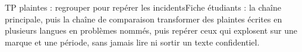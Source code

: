 \documentclass[11pt,a4paper]{article}
\begin{document}
  {TP plaintes : regrouper pour repérer les incidents}{Fiche étudiants : la chaîne principale, puis la chaîne de comparaison}
  {transformer des plaintes écrites en plusieurs langues en problèmes nommés, puis repérer ceux qui
  explosent sur une marque et une période, sans jamais lire ni sortir un texte confidentiel.}








\end{document}

